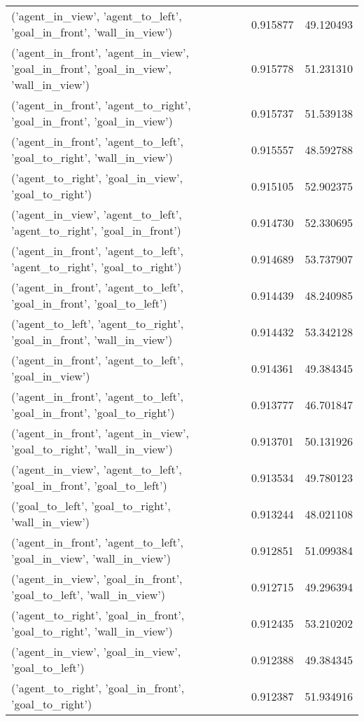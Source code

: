 \begin{tabular}{lrr}
('agent\_in\_view', 'agent\_to\_left', 'goal\_in\_front', 'wall\_in\_view') & 0.915877 & 49.120493 \\
('agent\_in\_front', 'agent\_in\_view', 'goal\_in\_front', 'goal\_in\_view', 'wall\_in\_view') & 0.915778 & 51.231310 \\
('agent\_in\_front', 'agent\_to\_right', 'goal\_in\_front', 'goal\_in\_view') & 0.915737 & 51.539138 \\
('agent\_in\_front', 'agent\_to\_left', 'goal\_to\_right', 'wall\_in\_view') & 0.915557 & 48.592788 \\
('agent\_to\_right', 'goal\_in\_view', 'goal\_to\_right') & 0.915105 & 52.902375 \\
('agent\_in\_view', 'agent\_to\_left', 'agent\_to\_right', 'goal\_in\_front') & 0.914730 & 52.330695 \\
('agent\_in\_front', 'agent\_to\_left', 'agent\_to\_right', 'goal\_to\_right') & 0.914689 & 53.737907 \\
('agent\_in\_front', 'agent\_to\_left', 'goal\_in\_front', 'goal\_to\_left') & 0.914439 & 48.240985 \\
('agent\_to\_left', 'agent\_to\_right', 'goal\_in\_front', 'wall\_in\_view') & 0.914432 & 53.342128 \\
('agent\_in\_front', 'agent\_to\_left', 'goal\_in\_view') & 0.914361 & 49.384345 \\
('agent\_in\_front', 'agent\_to\_left', 'goal\_in\_front', 'goal\_to\_right') & 0.913777 & 46.701847 \\
('agent\_in\_front', 'agent\_in\_view', 'goal\_to\_right', 'wall\_in\_view') & 0.913701 & 50.131926 \\
('agent\_in\_view', 'agent\_to\_left', 'goal\_in\_front', 'goal\_to\_left') & 0.913534 & 49.780123 \\
('goal\_to\_left', 'goal\_to\_right', 'wall\_in\_view') & 0.913244 & 48.021108 \\
('agent\_in\_front', 'agent\_to\_left', 'goal\_in\_view', 'wall\_in\_view') & 0.912851 & 51.099384 \\
('agent\_in\_view', 'goal\_in\_front', 'goal\_to\_left', 'wall\_in\_view') & 0.912715 & 49.296394 \\
('agent\_to\_right', 'goal\_in\_front', 'goal\_to\_right', 'wall\_in\_view') & 0.912435 & 53.210202 \\
('agent\_in\_view', 'goal\_in\_view', 'goal\_to\_left') & 0.912388 & 49.384345 \\
('agent\_to\_right', 'goal\_in\_front', 'goal\_to\_right') & 0.912387 & 51.934916 \\

\end{tabular}
